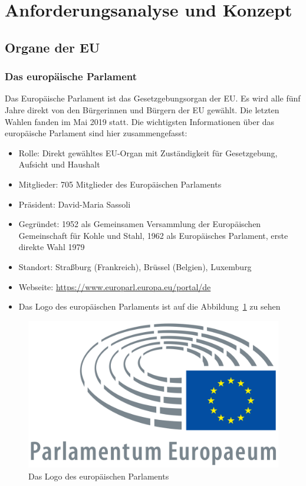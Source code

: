 \section{Anforderungsanalyse und Konzept}\label{sec:02_03_anforderungen_konzept}

\subsection{Organe der EU}

\subsubsection{Das europäische Parlament}\label{subsubsec:EuroParlament}

Das Europäische Parlament ist das Gesetzgebungsorgan der EU. Es wird alle fünf Jahre direkt von den Bürgerinnen und Bürgern der EU gewählt. Die letzten Wahlen fanden im Mai 2019 statt. Die wichtigsten Informationen über das europäische Parlament sind hier zusammengefasst:
\begin{itemize}
  \item Rolle: Direkt gewähltes EU-Organ mit Zuständigkeit für Gesetzgebung, Aufsicht und Haushalt
  \item Mitglieder: 705 Mitglieder des Europäischen Parlaments
  \item Präsident: David-Maria Sassoli
  \item Gegründet: 1952 als Gemeinsamen Versammlung der Europäischen Gemeinschaft für Kohle und Stahl, 1962 als Europäisches Parlament, erste direkte Wahl 1979
    \item Standort: Straßburg (Frankreich), Brüssel (Belgien), Luxemburg
    \item Webseite: \url{https://www.europarl.europa.eu/portal/de}
    \item Das Logo des europäischen Parlaments ist auf die Abbildung~\ref{fig:logoEuroParlament} zu sehen
\end{itemize}

\begin{figure}[H]
\centering
    \includegraphics[width=.8\textwidth]{images/Euro_Parlament.png}
    \caption{Das Logo des europäischen Parlaments}
    \label{fig:logoEuroParlament}
\end{figure}

